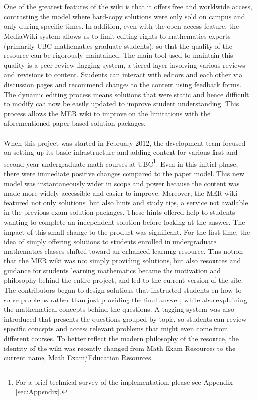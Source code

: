 \documentclass{primus}
\begin{document}
\\\\
\noindent{}One of the greatest features of the wiki is that it offers free and worldwide access, contrasting the model where hard-copy solutions were only sold on campus and only during specific times. In addition, even with the open access feature, the MediaWiki system allows us to limit editing rights to mathematics experts (primarily UBC mathematics graduate students), so that the quality of the resource can be rigorously maintained. The main tool used to maintain this quality is a peer-review flagging system, a tiered layer involving various reviews and revisions to content. Students can interact with editors and each other via discussion pages and recommend changes to the content using feedback forms. The dynamic editing process means solutions that were static and hence difficult to modify can now be easily updated to improve student understanding. This process allows the MER wiki to improve on the limitations with the aforementioned paper-based solution packages.
\\\\
\noindent{}When this project was started in February 2012, the development team focused on setting up its basic infrastructure and adding content for various first and second year undergraduate math courses at UBC\footnote{For a brief technical survey of the implementation, please see Appendix \ref{sec:Appendix}.
}. Even in this initial phase, there were immediate positive changes compared to the paper model. This new model was instantaneously wider in scope and power because the content was made more widely accessible and easier to improve. Moreover, the MER wiki featured not only solutions, but also hints and study tips, a service not available in the previous exam solution packages. These hints offered help to students wanting to complete an independent solution before looking at the answer. The impact of this small change to the product was significant. For the first time, the idea of simply offering solutions to students enrolled in undergraduate mathematics classes shifted toward an enhanced learning resource.
This notion \textemdash{} that the MER wiki was not simply providing solutions, but also resources and guidance for students learning mathematics \textemdash{} became the motivation and philosophy behind the entire project, and led to the current version of the site. The contributors began to design solutions that instructed students on how to solve problems rather than just providing the final answer, while also explaining the mathematical concepts behind the questions. A tagging system was also introduced that presents the questions grouped by topic, so students can review specific concepts and access relevant problems that might even come from different courses. To better reflect the modern philosophy of the resource, the identity of the wiki was recently changed from Math Exam Resources to the current name, Math Exam/Education Resources.
\end{document}
